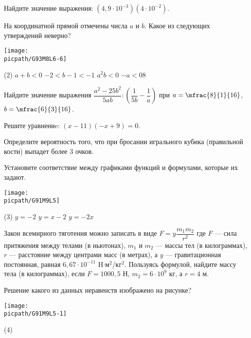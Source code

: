 \begin{class}[number=5]
	\begin{listofex}
		\item Найдите значение выражения: \((4,9\cdot10^{-3})(4\cdot10^{-2})\).
		\item На координатной прямой отмечены числа \( a \) и \( b \). Какое из следующих утверждений неверно?
		\begin{center}
			\texttt{[image: \\picpath/G93M8L6-6]}
		\end{center}
		\begin{tasks}(2)
			\task \( a+b<0 \)
			\task \( -2<b-1<-1 \)
			\task \( a^2b<0 \)
			\task \( -a<0 \)8
		\end{tasks}
		\item Найдите значение выражения \( \dfrac{a^2-25b^2}{5ab}:\left( \dfrac{1}{5b}-\dfrac{1}{a} \right) \) при \( a=\mfrac{8}{1}{16} \), \( b=\mfrac{6}{3}{16} \).
		\item Решите уравнениe: \((x-11)(-x+9)=0\).
		\item Определите вероятность того, что при бросании игрального кубика (правильной кости) выпадет более \( 3 \) очков.
		\item Установите соответствие между графиками функций и формулами, которые их задают.
		\begin{center}
			\texttt{[image: \\picpath/G91M9L5]}
		\end{center}
		\begin{tasks}(3)
			\task \( y=-2 \)
			\task \( y=x-2 \)
			\task \( y=-2x \)
		\end{tasks}
		\item Закон всемирного тяготения можно записать в виде \( F=y\dfrac{m_1m_2}{r^2} \) где \( F \) --- сила притяжения между телами (в ньютонах), \( m_1 \) и \( m_2 \) --- массы тел (в килограммах), \( r \) --- расстояние между центрами масс (в метрах), а \( y \) --- гравитационная постоянная, равная \( 6,67\cdot10^{−11} \) H\( \cdot \)м\( ^2 \)/кг\( ^2 \). Пользуясь формулой, найдите массу тела (в килограммах), если \( F=1000,5 \) Н, \( m_2=6\cdot10^9 \) кг, а \( r=4 \) м.
		\item Решение какого из данных неравенств изображено на рисунке?
		\begin{center}
			\texttt{[image: \\picpath/G91M9L5-1]}
		\end{center}
		\begin{tasks}(4)

\end{tasks}
\end{listofex}
\end{class}
